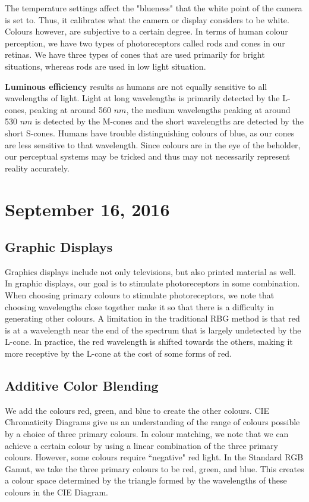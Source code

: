 \documentclass[11pt]{article}
\theoremstyle{plain} %
\theoremstyle{definition}
\theoremstyle{example}
\theoremstyle{remark}
\begin{document}
The temperature settings affect the "blueness" that the white point of the camera is set to. Thus, it calibrates what the camera or display considers to be white. Colours however, are subjective to a certain degree. In terms of human colour perception, we have two types of photoreceptors called rods and cones in our retinas. We have three types of cones that are used primarily for bright situations, whereas rods are used in low light situation. 

\textbf{Luminous efficiency} results as humans are not equally sensitive to all wavelengths of light. Light at long wavelengths is primarily detected by the L-cones, peaking at around 560 $nm$, the medium wavelengths peaking at around 530 $nm$ is detected by the M-cones and the short wavelengths are detected by the short S-cones. Humans have trouble distinguishing colours of blue, as our cones are less sensitive to that wavelength. Since colours are in the eye of the beholder, our perceptual systems may be tricked and thus may not necessarily represent reality accurately.


\section{September 16, 2016}
\subsection{Graphic Displays}

Graphics displays include not only televisions, but also printed material as well. In graphic displays, our goal is to stimulate photoreceptors in some combination. When choosing primary colours to stimulate photoreceptors, we note that choosing wavelengths close together make it so that there is a difficulty in generating other colours. A limitation in the traditional RBG method is that red is at a wavelength near the end of the spectrum that is largely undetected by the L-cone. In practice, the red wavelength is shifted towards the others, making it more receptive by the L-cone at the cost of some forms of red. 

\subsection{Additive Color Blending}

We add the colours red, green, and blue to create the other colours. CIE Chromaticity Diagrams give us an understanding of the range of colours possible by a choice of three primary colours. In colour matching, we note that we can achieve a certain colour by using a linear combination of the three primary colours. However, some colours require ``negative" red light. In the Standard RGB Gamut, we take the three primary colours to be red, green, and blue. This creates a colour space determined by the triangle formed by the wavelengths of these colours in the CIE Diagram. 
\end{document}
